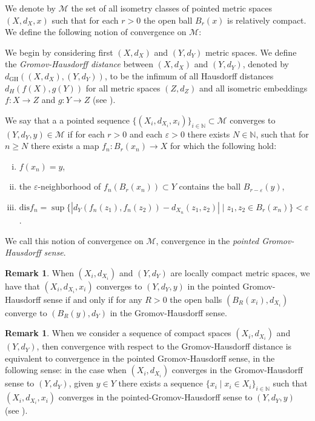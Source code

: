 \documentclass[12pt,a4paper,reqno]{amsart}
\theoremstyle{definition}
\newtheorem{rmk}[theorem]{Remark}
\numberwithin{equation}{section}
\newcommand{\N}{\mathbb{N}} %
\begin{document}
We denote by $\mathcal{M}$ the set of all isometry classes of pointed metric spaces $(X,d_X,x)$ such that for each $r>0$ the open ball $B_r(x)$ is relatively compact. We define the following notion of convergence on $\mathcal{M}$: 

We begin by considering first $(X,d_X)$ and $(Y,d_Y)$ metric spaces. We define the \emph{Gromov-Hausdorff distance} between $(X,d_X)$ and $(Y,d_Y)$, denoted by $d_{\mathrm{GH}}((X,d_X),(Y,d_Y))$, to be the infimum  of all Hausdorff distances $d_H(f(X),g(Y))$ for all metric spaces $(Z,d_Z)$  and all isometric embeddings $f\colon X\to Z$ and $g\colon Y\to Z$ (see  \cite[Section 7.3]{BuragoBuragoIvanov}).

We say that a a pointed sequence $\{(X_i,d_{X_i},x_i)\}_{i\in\N}\subset \mathcal{M}$ converges to $(Y,d_Y,y)\in \mathcal{M}$ if for each $r>0$ and each $\varepsilon>0$ there exists $N\in \N$, such that for $n\geq N$ there exists a map $f_n\colon B_r(x_n)\to X$ for which the following hold:
\begin{enumerate}[(i)]
\item $f(x_n) = y$,
\item the $\varepsilon$-neighborhood of $f_n(B_r(x_n))\subset Y$ contains the ball $B_{r-\varepsilon}(y)$,
\item $\mathrm{dis} f_n = \sup\{|d_Y(f_n(z_1),f_n(z_2))-d_{X_n}(z_1,z_2)|\mid z_1,z_2\in B_{r}(x_n)\}<\varepsilon$.
\end{enumerate}
We call this notion of convergence on $\mathcal{M}$, convergence in  the \emph{pointed Gromov-Hausdorff sense}.

\begin{rmk}
When $(X_i,d_{X_i})$ and $(Y,d_Y)$ are  locally compact metric spaces, we have that $(X_i,d_{X_i},x_i)$ converges to $(Y,d_Y,y)$ in the pointed Gromov-Hausdorff sense if and only if for any $R>0$ the open balls $(B_R(x_i),d_{X_i})$ converge to $(B_R(y),d_Y)$ in the Gromov-Hausdorff sense.
\end{rmk}

\begin{rmk}\th\label{R: GH convergence compact spaces implies pGH}
When we consider a sequence of compact spaces $(X_i,d_{X_i})$ and $(Y,d_Y)$, then convergence with respect to the Gromov-Hausdorff distance is equivalent to convergence in the pointed Gromov-Hausdorff sense, in the following sense: in the case when $(X_i,d_{X_i})$ converges in the Gromov-Hausdorff sense to $(Y,d_Y)$, given $y\in Y$ there exists a sequence $\{x_i\mid x_i\in X_i\}_{i\in \N}$ such that $(X_i,d_{X_i},x_i)$ converges in the pointed-Gromov-Hausdorff sense to $(Y,d_Y,y)$ (see \cite[Exercise 8.12]{BuragoBuragoIvanov}).
\end{rmk}
\end{document}
